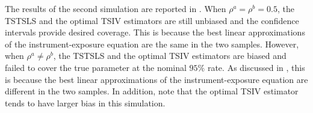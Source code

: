 \documentclass[preprint]{imsart}
\begin{document}
The results of the second simulation are reported in
. When $\rho^a = \rho^b = 0.5$, the TSTSLS and the optimal
TSIV estimators are still unbiased and the confidence intervals
provide desired coverage. This is because the best linear
approximations of the instrument-exposure equation are the same in the
two samples. However, when $\rho^a \ne \rho^b$, the TSTSLS and the
optimal TSIV estimators are biased and failed to cover the true
parameter at the nominal $95\%$ rate. As discussed in
, this is because the best linear
approximations of the instrument-exposure equation are different in
the two samples. In addition, note that the optimal TSIV estimator
tends to have larger bias in this simulation.

\end{document}
